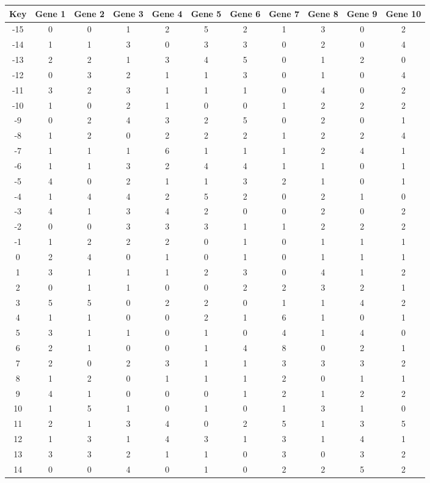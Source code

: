 \begin{tabular}{|c|c|c|c|c|c|c|c|c|c|c|}
\hline
Key & Gene 1 & Gene 2 & Gene 3 & Gene 4 & Gene 5 & Gene 6 & Gene 7 & Gene 8 & Gene 9 & Gene 10 \\
\hline
-15 & 0 & 0 & 1 & 2 & 5 & 2 & 1 & 3 & 0 & 2 \\
-14 & 1 & 1 & 3 & 0 & 3 & 3 & 0 & 2 & 0 & 4 \\
-13 & 2 & 2 & 1 & 3 & 4 & 5 & 0 & 1 & 2 & 0 \\
-12 & 0 & 3 & 2 & 1 & 1 & 3 & 0 & 1 & 0 & 4 \\
-11 & 3 & 2 & 3 & 1 & 1 & 1 & 0 & 4 & 0 & 2 \\
-10 & 1 & 0 & 2 & 1 & 0 & 0 & 1 & 2 & 2 & 2 \\
-9 & 0 & 2 & 4 & 3 & 2 & 5 & 0 & 2 & 0 & 1 \\
-8 & 1 & 2 & 0 & 2 & 2 & 2 & 1 & 2 & 2 & 4 \\
-7 & 1 & 1 & 1 & 6 & 1 & 1 & 1 & 2 & 4 & 1 \\
-6 & 1 & 1 & 3 & 2 & 4 & 4 & 1 & 1 & 0 & 1 \\
-5 & 4 & 0 & 2 & 1 & 1 & 3 & 2 & 1 & 0 & 1 \\
-4 & 1 & 4 & 4 & 2 & 5 & 2 & 0 & 2 & 1 & 0 \\
-3 & 4 & 1 & 3 & 4 & 2 & 0 & 0 & 2 & 0 & 2 \\
-2 & 0 & 0 & 3 & 3 & 3 & 1 & 1 & 2 & 2 & 2 \\
-1 & 1 & 2 & 2 & 2 & 0 & 1 & 0 & 1 & 1 & 1 \\
0 & 2 & 4 & 0 & 1 & 0 & 1 & 0 & 1 & 1 & 1 \\
1 & 3 & 1 & 1 & 1 & 2 & 3 & 0 & 4 & 1 & 2 \\
2 & 0 & 1 & 1 & 0 & 0 & 2 & 2 & 3 & 2 & 1 \\
3 & 5 & 5 & 0 & 2 & 2 & 0 & 1 & 1 & 4 & 2 \\
4 & 1 & 1 & 0 & 0 & 2 & 1 & 6 & 1 & 0 & 1 \\
5 & 3 & 1 & 1 & 0 & 1 & 0 & 4 & 1 & 4 & 0 \\
6 & 2 & 1 & 0 & 0 & 1 & 4 & 8 & 0 & 2 & 1 \\
7 & 2 & 0 & 2 & 3 & 1 & 1 & 3 & 3 & 3 & 2 \\
8 & 1 & 2 & 0 & 1 & 1 & 1 & 2 & 0 & 1 & 1 \\
9 & 4 & 1 & 0 & 0 & 0 & 1 & 2 & 1 & 2 & 2 \\
10 & 1 & 5 & 1 & 0 & 1 & 0 & 1 & 3 & 1 & 0 \\
11 & 2 & 1 & 3 & 4 & 0 & 2 & 5 & 1 & 3 & 5 \\
12 & 1 & 3 & 1 & 4 & 3 & 1 & 3 & 1 & 4 & 1 \\
13 & 3 & 3 & 2 & 1 & 1 & 0 & 3 & 0 & 3 & 2 \\
14 & 0 & 0 & 4 & 0 & 1 & 0 & 2 & 2 & 5 & 2 \\
\hline
\end{tabular}
